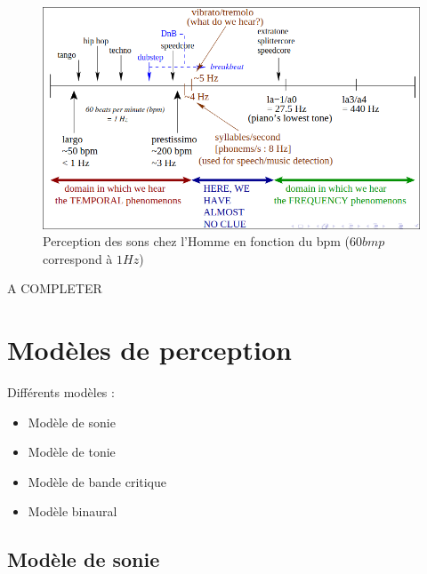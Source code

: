 \begin{figure}[hbt!]
    \centering
    \includegraphics[scale=0.4]{Pics/Perception_bpm.png}
    \caption{Perception des sons chez l'Homme en fonction du bpm ($60 bmp$ correspond à $1 Hz$)}
\end{figure}
\textcolor{BrickRed}{A COMPLETER}
\newpage
\section{Modèles de perception}
Différents modèles : \newline
\begin{itemize}
    \item Modèle de sonie
    \item Modèle de tonie
    \item Modèle de bande critique
    \item Modèle binaural
\end{itemize}

\subsection{Modèle de sonie}
